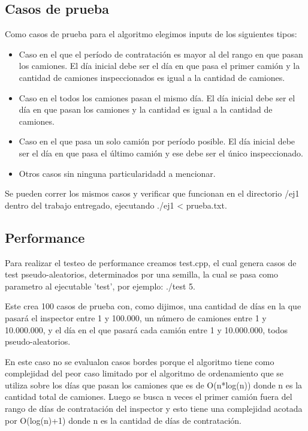 \subsection{Casos de prueba}

Como casos de prueba para el algoritmo elegimos inputs de los siguientes tipos:

\begin{itemize}
\item Caso en el que el per\'iodo de contrataci\'on es mayor al del rango en que pasan los camiones. El d\'ia inicial debe ser el d\'ia en que pasa el primer cami\'on y la cantidad de camiones inspeccionados es igual a la cantidad de camiones.
\item Caso en el todos los camiones pasan el mismo d\'ia. El d\'ia inicial debe ser el d\'ia en que pasan los camiones y la cantidad es igual a la cantidad de camiones.
\item Caso en el que pasa un solo cami\'on por per\'iodo posible. El d\'ia inicial debe ser el d\'ia en que pasa el \'ultimo cami\'on y ese debe ser el \'unico inspeccionado.
\item Otros casos sin ninguna particularidadd a mencionar.
\end{itemize}	

Se pueden correr los mismos casos y verificar que funcionan en el directorio /ej1 dentro del trabajo entregado, ejecutando ./ej1 < prueba.txt.

\subsection{Performance}

Para realizar el testeo de performance creamos test.cpp, el cual genera casos de test pseudo-aleatorios, determinados por una semilla, la cual se pasa como parametro al ejecutable 'test', por ejemplo: ./test 5.

Este crea 100 casos de prueba con, como dijimos, una cantidad de d\'ias en la que pasar\'a el inspector entre 1 y 100.000, un n\'umero de camiones entre 1 y 10.000.000, y el d\'ia en el que pasar\'a cada cami\'on entre 1 y 10.000.000, todos pseudo-aleatorios.

En este caso no se evalualon casos bordes porque el algoritmo tiene como complejidad del peor caso limitado por el algoritmo de ordenamiento que se utiliza sobre los d\'ias que pasan los camiones que es de O(n*log(n)) donde n es la cantidad total de camiones.
Luego se busca n veces el primer cami\'on fuera del rango de d\'ias de contrataci\'on del inspector y esto tiene una complejidad acotada por O(log(n)+1) donde n es la cantidad de d\'ias de contrataci\'on.

